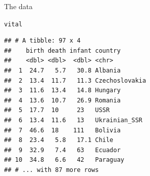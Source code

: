 \documentclass[unknownkeysallowed]{beamer}\usepackage[]{graphicx}\usepackage[]{color}
\makeatletter
\newcommand{\hlopt}[1]{\textcolor[rgb]{0,0,0}{#1}}%
\newcommand{\hlstd}[1]{\textcolor[rgb]{0.345,0.345,0.345}{#1}}%
\newcommand{\hlkwb}[1]{\textcolor[rgb]{0.69,0.353,0.396}{#1}}%
\newcommand{\hlkwd}[1]{\textcolor[rgb]{0.737,0.353,0.396}{\textbf{#1}}}%
\newenvironment{kframe}{%
 \def\at@end@of@kframe{}%
 \ifinner\ifhmode%
  \def\at@end@of@kframe{\end{minipage}}%
  \begin{minipage}{\columnwidth}%
 \fi\fi%
 \def\FrameCommand##1{\hskip\@totalleftmargin \hskip-\fboxsep
 \colorbox{shadecolor}{##1}\hskip-\fboxsep
     \hskip-\linewidth \hskip-\@totalleftmargin \hskip\columnwidth}%
 \MakeFramed {\advance\hsize-\width
   \@totalleftmargin\z@ \linewidth\hsize
   \@setminipage}}%
 {\par\unskip\endMakeFramed%
 \at@end@of@kframe}
\newenvironment{knitrout}{}{} %
\makeatother
\begin{document}
\begin{frame}[fragile]{The data}

\begin{knitrout}
\color{fgcolor}\begin{kframe}
\begin{alltt}
\hlstd{vital}
\end{alltt}
\begin{verbatim}
## # A tibble: 97 x 4
##    birth death infant country       
##    <dbl> <dbl>  <dbl> <chr>         
##  1  24.7   5.7   30.8 Albania       
##  2  13.4  11.7   11.3 Czechoslovakia
##  3  11.6  13.4   14.8 Hungary       
##  4  13.6  10.7   26.9 Romania       
##  5  17.7  10     23   USSR          
##  6  13.4  11.6   13   Ukrainian_SSR 
##  7  46.6  18    111   Bolivia       
##  8  23.4   5.8   17.1 Chile         
##  9  32.9   7.4   63   Ecuador       
## 10  34.8   6.6   42   Paraguay      
## # ... with 87 more rows
\end{verbatim}
\end{kframe}
\end{knitrout}

\end{frame}

\end{document}
